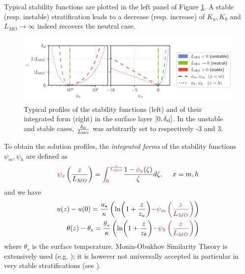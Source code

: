 Typical stability functions are plotted in the left panel of Figure
\ref{fig:airseaSCM_stabilityfunctions}.
A stable (resp. instable) stratification leads to a
decrease (resp. increase) of $K_u, K_\theta$ and
$L_{MO}\rightarrow \infty$ indeed recovers the neutral case.
\begin{figure}
	\centering
\includegraphics[scale=0.8]{images/stabilityfunctions.pdf}
	\caption{Typical profiles of the stability functions (left)
	and of their integrated form (right) in the
	surface layer $[0,\delta_{\rm sl}]$. In the unstable
	and stable cases, $\frac{\delta_{\rm sl}}{L_{\rm MO}}$
	was arbitrarily set to respectively -3 and 3.
	}
	\label{fig:airseaSCM_stabilityfunctions}
\end{figure}
To obtain the solution profiles,
the \textit{integrated forms}
of the stability functions $\psi_m, \psi_h$
are defined as
\begin{equation}
	\emphase{\psi_x}\left(\frac{z}{L_{MO}}\right)
	= \emphase{\int_0^{\frac{z}{L_{MO}}}}
	\frac{1 - \emphase{\phi_x}(\zeta)}{\zeta} d\zeta
	, ~~~~x=m,h
\end{equation}
and we have
\begin{equation}
\label{eq:airseaSCM_MOSTprofiles}
\begin{aligned}
	u(z)-u(0) = \frac{u_\star}{\kappa}
    \left(
	\ln(1+\frac{z}{z_{u}})
	\emphase{- \psi_m\left(\frac{z}{L_{MO}}\right)}
    \right)
    \\
    \theta(z) - \theta_s = 
	\frac{\emphase{\theta_\star}}{\kappa}
    \left(
	\ln(1+\frac{z}{z_{\theta}})
	\emphase{- \psi_h\left(\frac{z}{L_{MO}}\right)}
\right)
\end{aligned}
\end{equation}
where $\theta_s$ is the surface temperature.
Monin-Obukhov Similarity Theory
is extensively used (e.g. \citep{basu_cautionary_2017});
it is however not universally
accepted in particular in very stable stratifications
(see \citep{optis_moving_2014}).
